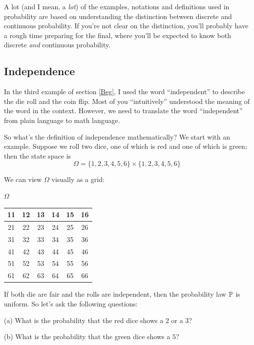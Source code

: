 \documentclass{ximera}
\begin{document}
\Lightning \Lightning  A lot (and I mean, a \textit{lot}) of the examples, notations and definitions used in probability are based on understanding the distinction between discrete and continuous probability. If you're not clear on the distinction, you'll probably have a rough time preparing for the final, where you'll be expected to know both discrete \textit{and} continuous probability. \Lightning \Lightning


\subsection{Independence}
In the third example of section \ref{Beg}, I used the word ``independent'' to describe the die roll and the coin flip. Most of you ``intuitively'' understood the meaning of the word in the context. However, we need to translate the word ``independent'' from plain language to math language.

So what's the definition of independence mathematically? We start with an example. Suppose we roll two dice, one of which is red and one of which is green; then the state space is 
$$
\Omega = \{1,2,3,4,5,6\} \times  \{1,2,3,4,5,6\} 
$$

We can view $\Omega$ visually as a grid:

\begin{center}
$\Omega$ \quad \quad \quad \quad \quad \quad \quad {} \quad \quad \quad \quad \

 \quad
\begin{tabular}{ | c | c | c | c | c | c | } 
\hline  11  & 12  & 13 & 14 & 15 &  16  \\ \hline
 21 &  22  & 23 & 24 & 25 & 26  \\ \hline
 31 & 32 & 33  & 34 & 35  & 36  \\ \hline
 41 & 42 & 43 & 44  & 45  & 46 \\ \hline
 51 & 52 & 53 & 54  & 55 &  56 \\ \hline
61 & 62 & 63 &  64 & 65 & 66  \\ \hline
\end{tabular}
\end{center}
If both die are fair and the rolls are independent, then the probability law $\mathbb{P}$ is uniform. So let's ask the following questions:

(a) What is the probability that the red dice shows a $2$ or a $3$?

(b) What is the probability that the green dice shows a $5$?
\end{document}
